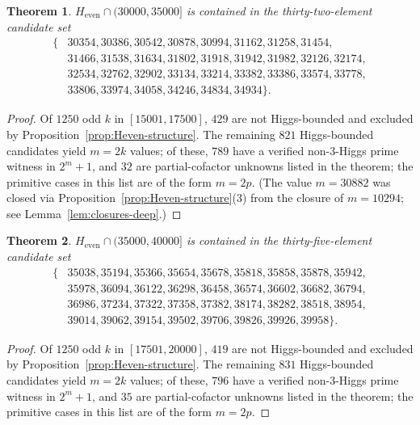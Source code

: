 \documentclass[11pt]{amsart}
\theoremstyle{plain}
\newtheorem{theorem}{Theorem}
\theoremstyle{definition}
\begin{document}
\begin{theorem}\label{thm:Heven-35000}
$H_{\mathrm{even}} \cap (30000, 35000]$ is contained in the
thirty-two-element candidate set
\[
\begin{aligned}
\{ & 30354, 30386, 30542, 30878, 30994, 31162, 31258, 31454,\\
   & 31466, 31538, 31634, 31802, 31918, 31942, 31982, 32126, 32174,\\
   & 32534, 32762, 32902, 33134, 33214, 33382, 33386, 33574, 33778,\\
   & 33806, 33974, 34058, 34246, 34834, 34934 \}.
\end{aligned}
\]
\end{theorem}

\begin{proof}
Of $1250$ odd $k$ in $[15001, 17500]$, $429$ are not Higgs-bounded
and excluded by Proposition~\ref{prop:Heven-structure}. The remaining
$821$ Higgs-bounded candidates yield $m = 2k$ values; of these,
$789$ have a verified non-3-Higgs prime witness in $2^m + 1$, and
$32$ are partial-cofactor unknowns listed in the theorem; the primitive cases in this list are of the form $m=2p$. (The value $m = 30882$ was closed
via Proposition~\ref{prop:Heven-structure}(3) from the closure of
$m = 10294$; see Lemma~\ref{lem:closures-deep}.)
\end{proof}

\begin{theorem}\label{thm:Heven-40000}
$H_{\mathrm{even}} \cap (35000, 40000]$ is contained in the
thirty-five-element candidate set
\[
\begin{aligned}
\{ & 35038, 35194, 35366, 35654, 35678, 35818, 35858, 35878, 35942,\\
   & 35978, 36094, 36122, 36298, 36458, 36574, 36602, 36682, 36794,\\
   & 36986, 37234, 37322, 37358, 37382, 38174, 38282, 38518, 38954,\\
   & 39014, 39062, 39154, 39502, 39706, 39826, 39926, 39958 \}.
\end{aligned}
\]
\end{theorem}

\begin{proof}
Of $1250$ odd $k$ in $[17501, 20000]$, $419$ are not Higgs-bounded
and excluded by Proposition~\ref{prop:Heven-structure}. The remaining
$831$ Higgs-bounded candidates yield $m = 2k$ values; of these,
$796$ have a verified non-3-Higgs prime witness in $2^m + 1$, and
$35$ are partial-cofactor unknowns listed in the theorem; the primitive cases in this list are of the form $m=2p$.
\end{proof}
\end{document}
